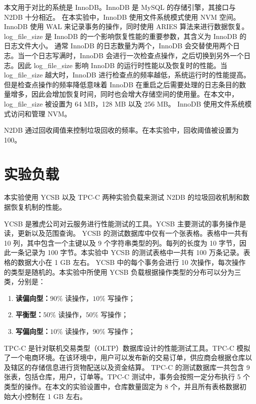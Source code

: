本文用于对比的系统是 InnoDB。InnoDB 是 MySQL 的存储引擎，其接口与 N2DB 十分相近。
在本实验中，InnoDB 使用文件系统模式使用 NVM 空间。
InnoDB 使用 WAL 来记录事务的操作，同时使用 ARIES 算法来进行数据恢复。
log\_file\_size 是 InnoDB 的一个影响恢复性能的重要参数，其含义为 InnoDB 的日志文件大小。
通常 InnoDB 的日志数量为两个，InnoDB 会交替使用两个日志。当一个日志写满时，InnoDB 会进行一次检查点操作，之后切换到另外一个日志。因此 log\_file\_size 影响 InnoDB 的运行时性能以及恢复时的性能。当 log\_file\_size 越大时，InnoDB 进行检查点的频率越低，系统运行时的性能提高。但是检查点操作的频率降低意味着 InnoDB 在重启之后需要处理的日志条目的数量增多，因此会增加恢复时间，同时也会增大存储空间的使用量。在本文中，log\_file\_size 被设置为 64 MB，128 MB 以及 256 MB。
InnoDB 使用文件系统模式访问和管理 NVM。

N2DB 通过回收阈值来控制垃圾回收的频率。在本实验中，回收阈值被设置为 100。

\section{实验负载}

本实验使用 YCSB 以及 TPC-C 两种实验负载来测试 N2DB 的垃圾回收机制和数据恢复机制的性能。

YCSB 是雅虎公司对云服务进行性能测试的工具。YCSB 主要测试的事务操作是读，更新以及范围查询。
YCSB 的测试数据库中仅有一个张表格。表格中一共有 10 列，其中包含一个主键以及 9 个字符串类型的列。每列的长度为 10 字节，因此一条记录为 100 字节。本实验中 YCSB 的测试表格中一共有 100 万条记录。表格的数据大小在 1 GB 左右。
YCSB 中的每个事务会进行 10 次操作，每次操作的类型是随机的。本实验中所使用 YCSB 负载根据操作类型的分布可以分为三类，分别是：
\begin{enumerate}
    \item \textbf{读偏向型：}$90\%$ 读操作，$10\%$ 写操作；
    \item \textbf{平衡型：}$50\%$ 读操作，$50\%$ 写操作；
    \item \textbf{写偏向型：}$10\%$ 读操作，$90\%$ 写操作；
\end{enumerate}


TPC-C 是针对联机交易类型（OLTP）数据库设计的性能测试工具。TPC-C 模拟了一个电商环境。在该环境中，用户可以发布新的交易订单，供应商会根据仓库以及辖区的存储信息进行货物配送以及资金结算。
TPC-C 的测试数据库一共包含 9 张表，包括仓库，用户，订单等。TPC-C 测试中，事务会按照一定分布执行 5 个类型的操作。在本文的实验设置中，仓库数量固定为 8 个，并且所有表格数据初始大小控制在 1 GB 左右。

